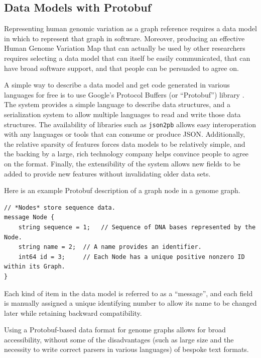 
\subsection{Data Models with Protobuf}

Representing human genomic variation as a graph reference requires a data model in which to represent that graph in software. Moreover, producing an effective Human Genome Variation Map that can actually be used by other researchers requires selecting a data model that can itself be easily communicated, that can have broad software support, and that people can be persuaded to agree on.

A simple way to describe a data model and get code generated in various languages for free is to use Google's Protocol Buffers (or ``Protobuf'') library \cite{varda2008protocol}. The system provides a simple language to describe data structures, and a serialization system to allow multiple languages to read and write those data structures. The availability of libraries such as \texttt{json2pb} allows easy interoperation with any languages or tools that can consume or produce JSON. Additionally, the relative sparsity of features forces data models to be relatively simple, and the backing by a large, rich technology company helps convince people to agree on the format. Finally, the extensibility of the system allows new fields to be added to provide new features without invalidating older data sets.

Here is an example Protobuf description of a graph node in a genome graph. 

\begin{lstlisting}
// *Nodes* store sequence data.
message Node {
    string sequence = 1;   // Sequence of DNA bases represented by the Node.
    string name = 2;  // A name provides an identifier.
    int64 id = 3;     // Each Node has a unique positive nonzero ID within its Graph.
}
\end{lstlisting}

Each kind of item in the data model is referred to as a ``message'', and each field is manually assigned a unique identifying number to allow its name to be changed later while retaining backward compatibility.

Using a Protobuf-based data format for genome graphs allows for broad accessibility, without some of the disadvantages (such as large size and the necessity to write correct parsers in various languages) of bespoke text formats.

